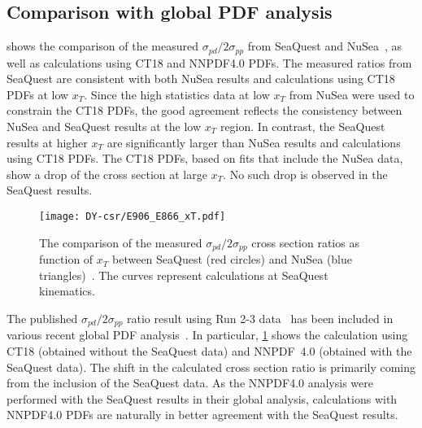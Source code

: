 \documentclass[../main.tex]{subfiles}
\begin{document}
\subsection{Comparison with global PDF analysis}
 shows the comparison of the measured $\sigma_{pd}/2\sigma_{pp}$ from SeaQuest and NuSea~\cite{towell2001},
as well as calculations using CT18 and NNPDF4.0 PDFs.
The measured ratios from SeaQuest are consistent with both NuSea results and calculations using CT18 PDFs
at low $x_T$. Since the high statistics data at low $x_T$ from NuSea were used to constrain
the CT18 PDFs, the good agreement reflects the consistency between NuSea and SeaQuest results
at the low $x_T$ region. 
In contrast, the SeaQuest results at higher $x_T$ are significantly larger than NuSea results and calculations using CT18 PDFs.
The CT18 PDFs, based on fits that include the NuSea data, show a drop of the cross section
at large $x_T$. No such drop is  observed in the SeaQuest results.
\begin{figure}[h!]
	\centering
	\texttt{[image: DY-csr/E906\_E866\_xT.pdf]}
	\caption{The comparison of the measured $\sigma_{pd}/2\sigma_{pp}$ cross section ratios as function of $x_T$
		between SeaQuest (red circles) and NuSea (blue triangles)~\cite{towell2001}.
		The curves represent calculations at SeaQuest kinematics.}
	\label{fig:e866_e906}
\end{figure} 

The published $\sigma_{pd}/2\sigma_{pp}$ ratio result using Run 2-3 data~\cite{dove2021,dove2023}
has been included in various recent global PDF analysis~\cite{cocuzza2021,guzzi2022,accardi2023,alekhin2023}.
In particular, \cref{fig:e866_e906} shows the calculation using CT18 (obtained without the SeaQuest data)
and NNPDF~4.0 (obtained with the SeaQuest data). The shift in the calculated cross section ratio is primarily
coming from the inclusion of the SeaQuest data.
As the NNPDF4.0 analysis were performed with the SeaQuest results in their global analysis,
calculations with NNPDF4.0 PDFs are naturally in better agreement with the SeaQuest results.
\end{document}
